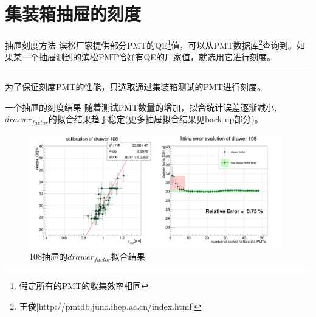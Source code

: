 \documentclass[11pt,compress,xcolor=x11names,UTF8]{beamer}
\begin{document}
\section{集装箱抽屉的刻度}
\begin{frame}{抽屉刻度方法}
滨松厂家提供部分PMT的QE\footnote{假定所有的PMT的收集效率相同}值，可以从PMT数据库\footnote{王俊[http://pmtdb.juno.ihep.ac.cn/index.html]}查询到。如果某一个抽屉测到的滨松PMT恰好有QE的厂家值，就选用它进行刻度。

\vspace{.5cm}
\hrule{\textwidth}
\vspace{.5cm}
为了保证刻度PMT的性能，只选取通过集装箱测试的PMT进行刻度。
\end{frame}
\begin{frame}{一个抽屉的刻度结果}
随着测试PMT数量的增加，拟合统计误差逐渐减小,$drawer_{factor}$的拟合结果趋于稳定(更多抽屉拟合结果见back-up部分)。
\begin{figure}
\centering
\includegraphics[width=0.98\textwidth]{sta101-7} %
\caption{108抽屉的$drawer_{factor}$拟合结果}
\end{figure}
\end{frame}
\end{document}
